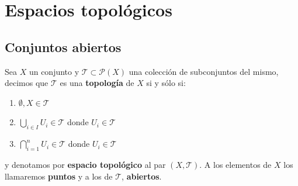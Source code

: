 \chapter{Espacios topológicos}
\label{cha:espacios_topologicos}

\section{Conjuntos abiertos}
\label{sec:conjuntos_abiertos}
\begin{defi}
Sea $X$ un conjunto y $\mathcal{T} \subset \mathcal{P}\left( X \right)$ una colección de subconjuntos del mismo, decimos que $\mathcal{T}$ es una \textbf{topología} de $X$ si y sólo si:
\begin{enumerate}
    \item $\emptyset, X \in \mathcal{T}$ 
    \item $\bigcup_{i \in I} U_i \in \mathcal{T}$ donde $U_i \in \mathcal{T}$
    \item $\bigcap_{i=1}^n U_i \in \mathcal{T}$ donde $U_i \in \mathcal{T}$
\end{enumerate}
y denotamos por \textbf{espacio topológico} al par $\left( X, \mathcal{T} \right)$. A los elementos de $X$ los llamaremos \textbf{puntos} y a los de $\mathcal{T}$, \textbf{abiertos}.
\end{defi}

